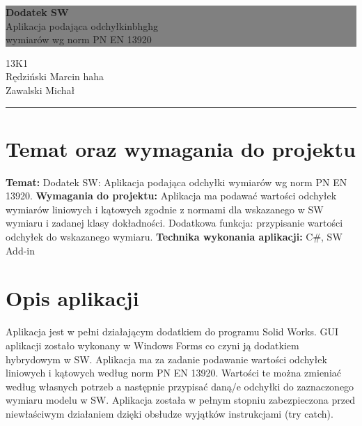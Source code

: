 \documentclass[11pt,a4paper]{article}
\newcommand{\HRule}[1]{\hfill \rule{0.2\linewidth}{#1}}
\begin{document}
\colorbox{grey}{
	\parbox[t]{1.0\linewidth}{
		\centering \fontsize{30pt}{40pt}\selectfont %
		\vspace*{0.7cm} 
		
		\hfill \textbf{Dodatek SW} \\
		\hfill Aplikacja podająca odchyłkinbhghg \\
		\hfill wymiarów wg norm PN EN 13920 \par
		
		\vspace*{0.7cm} %
	}
}
\vfill
{\centering \large 
\hfill 13K1 \\
\hfill Rędziński Marcin haha \\
\hfill Zawalski Michał \\
\HRule{1pt}} %

\newpage
\tableofcontents
\newpage
\section{Temat oraz wymagania do projektu}

\textbf{Temat: } Dodatek SW: Aplikacja podająca odchyłki wymiarów wg norm PN EN
13920.
\newline
\newline
\textbf{Wymagania do projektu: } Aplikacja ma podawać wartości odchyłek wymiarów
liniowych i kątowych zgodnie z normami dla wskazanego w SW wymiaru i
zadanej klasy dokładności. Dodatkowa funkcja: przypisanie wartości odchyłek
do wskazanego wymiaru.
\newline
\newline
\textbf{Technika wykonania aplikacji: } C\#, SW Add-in

\section{Opis aplikacji}

Aplikacja jest w pełni działającym dodatkiem do programu Solid Works. GUI aplikacji zostało wykonany w Windows Forms co czyni ją dodatkiem hybrydowym w SW. Aplikacja ma za zadanie podawanie wartości odchyłek liniowych i kątowych według norm PN EN 13920. Wartości te można zmieniać według własnych potrzeb a następnie przypisać daną/e odchyłki do zaznaczonego wymiaru modelu w SW. Aplikacja została w pełnym stopniu zabezpieczona przed niewłaściwym działaniem dzięki obsłudze wyjątków instrukcjami (try catch). 
\end{document}
